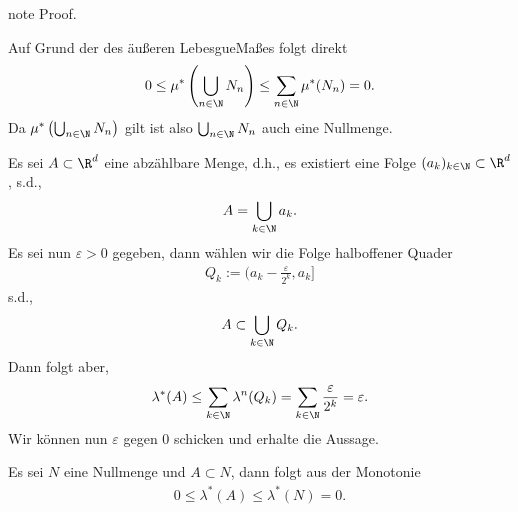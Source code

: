 \documentclass[letterpaper,10pt,english]{jupyterBook}
\begin{document}
\begin{sphinxadmonition}{note}
\sphinxAtStartPar
Proof. 

\sphinxAtStartPar
{}

\sphinxAtStartPar
Auf Grund der  des äußeren Lebesgue\sphinxhyphen{}Maßes folgt direkt
\begin{equation*}
\begin{split}0 \leq \mu^* \left( \bigcup_{n\in\N} N_n \right) \leq \sum_{n\in\N} \mu^*(N_n) = 0.\end{split}
\end{equation*}
\sphinxAtStartPar
Da \(\mu^* \left( \bigcup_{n\in\N} N_n \right)\) gilt ist also \(\bigcup_{n\in\N} N_n\) auch eine Nullmenge.

\sphinxAtStartPar
{}

\sphinxAtStartPar
Es sei \(A\subset\R^d\) eine abzählbare Menge, d.h., es existiert eine Folge \((a_k)_{k\in\N}\subset\R^d\), s.d.,
\begin{equation*}
\begin{split}A = \bigcup_{k\in\N} a_k.\end{split}
\end{equation*}
\sphinxAtStartPar
Es sei nun \(\varepsilon>0\) gegeben, dann wählen wir die Folge halboffener Quader
\begin{equation*}
\begin{split}Q_k := (a_k - \frac{\varepsilon}{2^k},a_k]\end{split}
\end{equation*}
\sphinxAtStartPar
s.d.,
\begin{equation*}
\begin{split}A\subset \bigcup_{k\in\N} Q_k.\end{split}
\end{equation*}
\sphinxAtStartPar
Dann folgt aber,
\begin{equation*}
\begin{split}\lambda^\ast(A) \leq \sum_{k\in\N} \lambda^n(Q_k) = \sum_{k\in\N} \frac{\varepsilon}{2^k} = \varepsilon.\end{split}
\end{equation*}
\sphinxAtStartPar
Wir können nun \(\varepsilon\) gegen 0 schicken und erhalte die Aussage.

\sphinxAtStartPar
{}

\sphinxAtStartPar
Es sei \(N\) eine Nullmenge und \(A\subset N\), dann folgt aus der Monotonie
\begin{equation*}
\begin{split}0\leq \lambda^\ast(A)\leq \lambda^\ast(N) = 0.\end{split}
\end{equation*}\end{sphinxadmonition}
\end{document}
